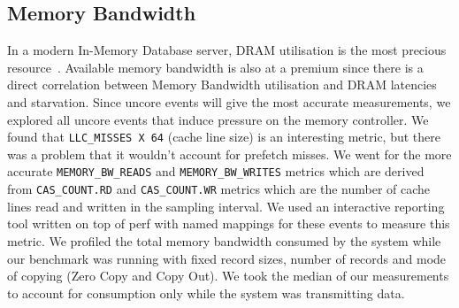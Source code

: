 

%

%




\subsection{Memory Bandwidth}
In a modern In-Memory Database server, DRAM utilisation is the most precious resource~\cite{ramcloudfast}. 
 Available memory bandwidth is also at a premium since there is a direct correlation between Memory Bandwidth
 utilisation and DRAM latencies and starvation. Since uncore events will give the most accurate measurements,
 we explored all uncore events that induce pressure on the memory controller. We found that 
\texttt{LLC\_MISSES X 64} (cache line size) is an interesting metric, but there was a problem that it wouldn't account for prefetch 
 misses. We went for the more accurate \texttt{MEMORY\_BW\_READS} and \texttt{MEMORY\_BW\_WRITES} metrics which are derived from 
 \texttt{CAS\_COUNT.RD} and \texttt{CAS\_COUNT.WR} metrics which are the number of cache lines read and written in the sampling 
 interval. We used an interactive reporting tool written on top of perf with named mappings for these events
 to measure this metric. We profiled the total memory bandwidth consumed by the system while our benchmark 
 was running with fixed record sizes, number of records and mode of copying (Zero Copy and Copy Out). We took the median of our measurements 
 to account for consumption only while the system was transmitting data.


